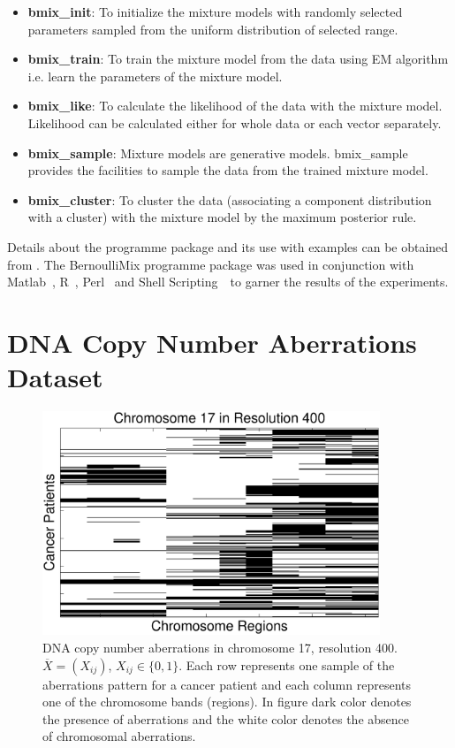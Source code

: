 \begin{itemize}
\item \textbf{bmix\_init}: To initialize the mixture models with randomly selected parameters sampled from the uniform distribution of selected range.
\item \textbf{bmix\_train}: To train the mixture model from the data using EM algorithm i.e. learn the parameters of the mixture model.
\item \textbf{bmix\_like}: To calculate the likelihood of the data with the mixture model. Likelihood can be calculated either for whole data or each vector separately.
\item \textbf{bmix\_sample}: Mixture models are generative models. bmix\_sample provides the facilities to sample the data from the trained mixture model.
\item \textbf{bmix\_cluster}: To cluster the data (associating a component distribution with a cluster) with the mixture model by the maximum posterior rule.
\end{itemize}

Details about the programme package and its use with examples can be obtained from \cite {bmixdoc}. The BernoulliMix programme package was used in conjunction with Matlab~\cite{matlab}, R~\cite{rlang}, Perl~\cite{perl} and Shell Scripting~\cite{shellscript}~to garner the results of the experiments.

\section{DNA Copy Number Aberrations Dataset}
\label{s:dataset}

\begin{figure}[h!]
\centering
\includegraphics[width=0.9\textwidth]{figures/chr17dm400}
\caption[Aberrations in chromosome 17 in resolution 400]{DNA copy number aberrations in chromosome 17, resolution 400. $\overline{X}=(X_{ij})$, $X_{ij}\in \{0,1\}$. Each row represents one sample of the aberrations pattern for a cancer patient and each column represents one of the chromosome bands (regions). In figure dark color denotes the presence of aberrations and the white color denotes the absence of chromosomal aberrations.} \label{Fig:data}
\end{figure}

